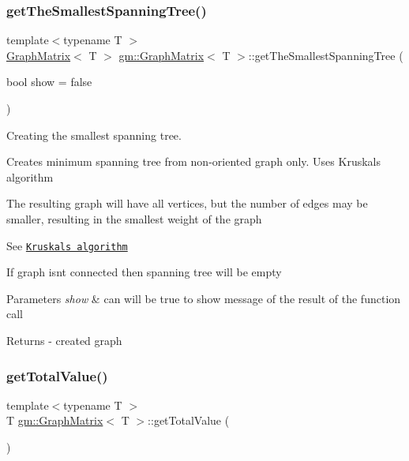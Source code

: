 \subsubsection{\texorpdfstring{get\+The\+Smallest\+Spanning\+Tree()}{getTheSmallestSpanningTree()}}
{\footnotesize\ttfamily template$<$typename T $>$ \\
\mbox{\hyperlink{classgm_1_1_graph_matrix}{Graph\+Matrix}}$<$ T $>$ \mbox{\hyperlink{classgm_1_1_graph_matrix}{gm\+::\+Graph\+Matrix}}$<$ T $>$\+::get\+The\+Smallest\+Spanning\+Tree (\begin{DoxyParamCaption}\item[{bool}]{show = {\ttfamily false} }\end{DoxyParamCaption})}



Creating the smallest spanning tree. 

Creates minimum spanning tree from non-\/oriented graph only. Uses Kruskal\textquotesingle{}s algorithm

The resulting graph will have all vertices, but the number of edges may be smaller, resulting in the smallest weight of the graph

See \href{https://en.wikipedia.org/wiki/Kruskal%27s_algorithm}{\tt Kruskal\textquotesingle{}s algorithm}

If graph isn\textquotesingle{}t connected then spanning tree will be empty 
\begin{DoxyParams}{Parameters}
{\em show} & can will be true to show message of the result of the function call \\
\hline
\end{DoxyParams}
\begin{DoxyReturn}{Returns}
-\/ created graph 
\end{DoxyReturn}
\mbox{\label{classgm_1_1_graph_matrix_a2dd4beb317ef1742df02eee6581c1194}} 
\subsubsection{\texorpdfstring{get\+Total\+Value()}{getTotalValue()}}
{\footnotesize\ttfamily template$<$typename T $>$ \\
T \mbox{\hyperlink{classgm_1_1_graph_matrix}{gm\+::\+Graph\+Matrix}}$<$ T $>$\+::get\+Total\+Value (\begin{DoxyParamCaption}{ }\end{DoxyParamCaption})}

